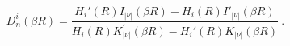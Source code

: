 \begin{equation}
D_n^i(\beta R)=\frac{H_i'(R)I_{|\nu|}(\beta R)-H_i(R)I'_{|\nu|}(\beta R)}
{H_{i}(R)K^{'}_{|\nu|}(\beta R)-H_i'(R)K_{|\nu|}(\beta R)} \ .
\label{17}
\end{equation} 
